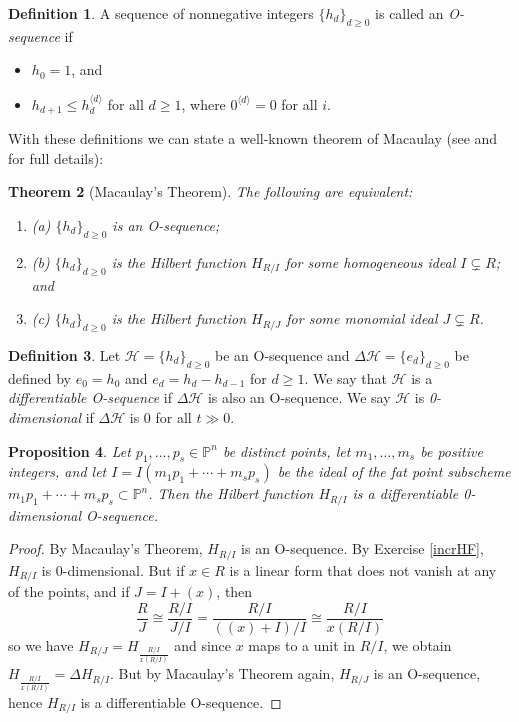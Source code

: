 \documentclass[11pt,twoside]{amsart}
\numberwithin{equation}{section}
\newtheorem{theorem}{Theorem}[section]
\newtheorem{proposition}[theorem]{Proposition}
\theoremstyle{definition}
\newtheorem{definition}[theorem]{Definition}
\begin{document}
\begin{definition}
A sequence of nonnegative integers $\{h_d\}_{d \geq 0}$ is called an \emph{O-sequence} if
\begin{itemize}
\item $h_0 = 1$, and
\item $h_{d+1} \leq h_d^{\langle d \rangle}$ for all $d \geq 1$, where $0^{\langle d \rangle}=0$ for all $i$.
\end{itemize}
\end{definition}

With these definitions we can state a well-known 
theorem of Macaulay (see \cite{refM} and \cite{refSt} for full details):

\begin{theorem}[Macaulay's Theorem]
The following are equivalent:
\begin{enumerate}
\item{(a)} $\{h_d\}_{d \geq 0}$ is an O-sequence;
\item{(b)} $\{h_d\}_{d \geq 0}$ is the Hilbert function $H_{R/I}$ for some homogeneous ideal $I \subsetneq R$; and
\item{(c)} $\{h_d\}_{d \geq 0}$ is the Hilbert function $H_{R/J}$ for some monomial ideal $J \subsetneq R$.
\end{enumerate}
\end{theorem}

\begin{definition}
Let $\mathcal{H} = \{h_d\}_{d \geq 0}$ be an O-sequence and $\Delta \mathcal{H} = \{e_d\}_{d \ge 0}$ be defined by $e_0 = h_0$ and $e_d = h_d - h_{d-1}$ for $d \geq 1$.  We say that $\mathcal{H}$ is a \emph{differentiable O-sequence} if $\Delta \mathcal{H}$ is also an O-sequence. We say $\mathcal{H}$ is \emph{0-dimensional}
if $\Delta \mathcal{H}$ is 0 for all $t\gg0$.
\end{definition}

\begin{proposition}
Let $p_1,\ldots,p_s\in{\mathbb{P}^{n}}$ be distinct points, let $m_1,\ldots,m_s$ be positive integers,
and let $I=I(m_1p_1+\cdots+m_sp_s)$ be the ideal of the fat point subscheme 
$m_1p_1+\cdots+m_sp_s\subset{\mathbb{P}^{n}}$.
Then the Hilbert function $H_{R/I}$ is a differentiable 0-dimensional O-sequence.
\end{proposition}

\begin{proof}
By Macaulay's Theorem, $H_{R/I}$ is an O-sequence. By Exercise \ref{incrHF}, $H_{R/I}$ is 
0-dimensional. But if $x\in R$ is a linear form that does not vanish at any of the points,
and if $J=I+(x)$, then 
$$\frac{R}{J}\cong\frac{R/I}{J/I}=\frac{R/I}{((x)+I)/I}\cong \frac{R/I}{x(R/I)}$$
so we have $H_{R/J}=H_{\frac{R/I}{x(R/I)}}$
and since $x$ maps to a unit in $R/I$, we obtain 
$H_{\frac{R/I}{x(R/I)}}=\Delta H_{R/I}$. But by Macaulay's Theorem again,
$H_{R/J}$ is an O-sequence, hence $H_{R/I}$ is a differentiable O-sequence.
\end{proof}
\end{document}
